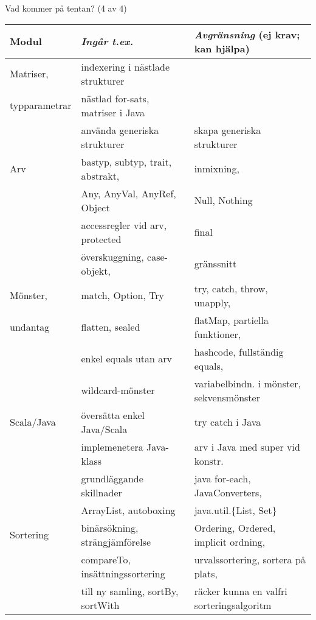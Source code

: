 \begin{Slide}{Vad kommer på tentan? (4 av 4)}\SlideFontTiny
\hspace{-2em}\begin{minipage}{1.0\textwidth}
\begin{tabular}{l | l | l}
\textbf{Modul} & \textit{Ingår t.ex.}& \textit{Avgränsning} (ej krav; kan hjälpa)\\\hline

Matriser,     & indexering i nästlade strukturer & \\
typparametrar & nästlad for-sats, matriser i Java  & \\
              & använda generiska strukturer & skapa generiska strukturer\\
\hline

Arv         &  bastyp, subtyp, trait, abstrakt,   & inmixning, \\
            &  Any, AnyVal, AnyRef, Object     & Null, Nothing\\
            &  accessregler vid arv, protected & final\\
            &  överskuggning, case-objekt,     & gränssnitt\\
\hline

Mönster,     & match, Option, Try       & try, catch, throw, unapply,\\
undantag     & flatten, sealed          & flatMap, partiella funktioner,\\
             & enkel equals utan arv    & hashcode, fullständig equals,   \\
             & wildcard-mönster         & variabelbindn. i mönster, sekvensmönster\\
\hline


Scala/Java & översätta enkel Java/Scala & try catch i Java \\
           & implemenetera Java-klass  &  arv i Java med super vid konstr.\\
           & grundläggande skillnader & java for-each, JavaConverters,\\
           & ArrayList, autoboxing & java.util.\{List, Set\}\\
\hline

Sortering & binärsökning, strängjämförelse & Ordering, Ordered, implicit ordning, \\
             & compareTo, insättningssortering & urvalssortering, sortera på plats,\\
             & till ny samling, sortBy, sortWith & räcker kunna en valfri sorteringsalgoritm \\
\hline

\end{tabular}
\end{minipage}
\end{Slide}




